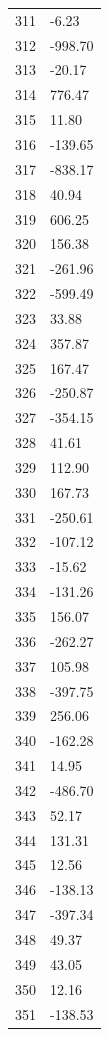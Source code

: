\documentclass[a4paper,11pt]{article}
\begin{document}
\begin{center}
\begin{longtable}{|R{1.5cm}|R{2.5cm}|}
  311 &        -6.23 \\
  312 &      -998.70 \\
  313 &       -20.17 \\
  314 &       776.47 \\
  315 &        11.80 \\
  316 &      -139.65 \\
  317 &      -838.17 \\
  318 &        40.94 \\
  319 &       606.25 \\
  320 &       156.38 \\
  321 &      -261.96 \\
  322 &      -599.49 \\
  323 &        33.88 \\
  324 &       357.87 \\
  325 &       167.47 \\
  326 &      -250.87 \\
  327 &      -354.15 \\
  328 &        41.61 \\
  329 &       112.90 \\
  330 &       167.73 \\
  331 &      -250.61 \\
  332 &      -107.12 \\
  333 &       -15.62 \\
  334 &      -131.26 \\
  335 &       156.07 \\
  336 &      -262.27 \\
  337 &       105.98 \\
  338 &      -397.75 \\
  339 &       256.06 \\
  340 &      -162.28 \\
  341 &        14.95 \\
  342 &      -486.70 \\
  343 &        52.17 \\
  344 &       131.31 \\
  345 &        12.56 \\
  346 &      -138.13 \\
  347 &      -397.34 \\
  348 &        49.37 \\
  349 &        43.05 \\
  350 &        12.16 \\
  351 &      -138.53 \\

\end{longtable}
\end{center}
\end{document}
